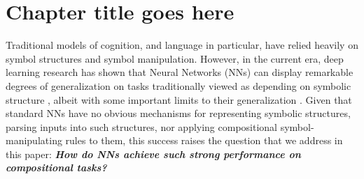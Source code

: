 \chapter{Chapter title goes here} \label{chap:chap-1}



Traditional models of cognition, and language in particular, have relied heavily on symbol structures and symbol manipulation.
However, in the current era, deep learning research has shown that Neural Networks (NNs) can display remarkable degrees of generalization on tasks traditionally viewed as depending on symbolic structure  \citep{googlenmt, mccoy}, albeit with some important limits to their generalization \citep{lake2018generalization}.
Given that standard NNs have no obvious mechanisms for representing symbolic structures, parsing inputs into such structures, nor applying compositional symbol-manipulating rules to them, this success raises the question that we address in this paper:\textbf{\emph{ How do NNs achieve such strong performance on compositional tasks?}} 
